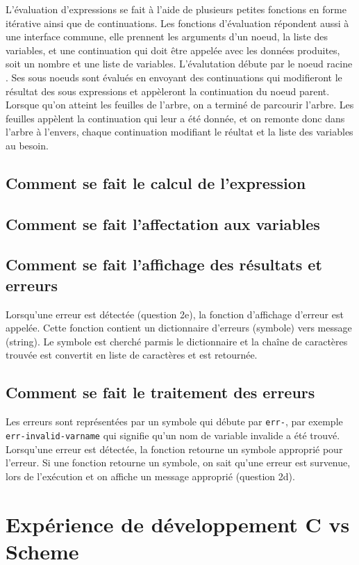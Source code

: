 \documentclass[a4paper,12pt,french]{article}
\begin{document}
        L'évaluation d'expressions se fait à l'aide de plusieurs petites fonctions en forme itérative ainsi que de continuations. Les fonctions d'évaluation répondent aussi à une interface commune, elle prennent les arguments d'un noeud, la liste des variables, et une continuation qui doit être appelée avec les données produites, soit un nombre et une liste de variables. L'évalutation débute par le noeud \og racine \fg{}. Ses sous noeuds sont évalués en envoyant des continuations qui modifieront le résultat des sous expressions et appèleront la continuation du noeud parent. Lorsque qu'on atteint les feuilles de l'arbre, on a terminé de parcourir l'arbre. Les feuilles appèlent la continuation qui leur a été donnée, et on remonte donc dans l'arbre à l'envers, chaque continuation modifiant le réultat et la liste des variables au besoin.
        \subsection{Comment se fait le calcul de l'expression}
	\subsection{Comment se fait l'affectation aux variables}
	\subsection{Comment se fait l'affichage des résultats et erreurs}
        Lorsqu'une erreur est détectée (question 2e), la fonction d'affichage d'erreur est appelée. Cette fonction contient un dictionnaire d'erreurs (symbole) vers message (string). Le symbole est cherché parmis le dictionnaire et la chaîne de caractères trouvée est convertit en liste de caractères et est retournée.
	\subsection{Comment se fait le traitement des erreurs}
        Les erreurs sont représentées par un symbole qui débute par \lstinline$err-$, par exemple \lstinline$err-invalid-varname$ qui signifie qu'un nom de variable invalide a été trouvé. Lorsqu'une erreur est détectée, la fonction retourne un symbole approprié pour l'erreur. Si une fonction retourne un symbole, on sait qu'une erreur est survenue, lors de l'exécution et on affiche un message approprié (question 2d).
\section{Expérience de développement C vs Scheme}
\end{document}
